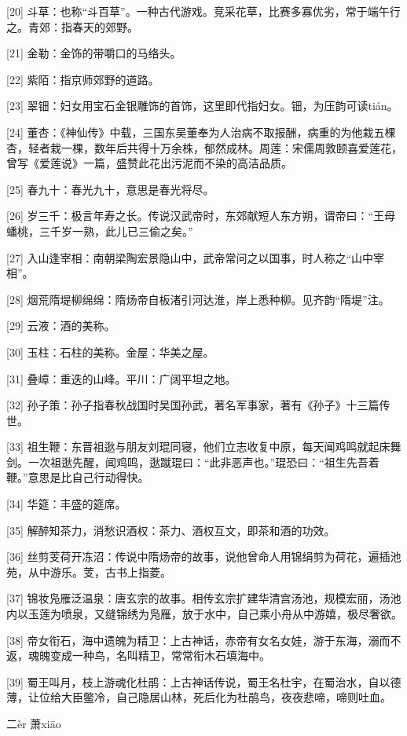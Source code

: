 \documentclass[12pt,UTF8]{ctexbook}
\begin{document}
[20] 斗草：也称“斗百草”。一种古代游戏。竞采花草，比赛多寡优劣，常于端午行之。青郊：指春天的郊野。

[21] 金勒：金饰的带嚼口的马络头。

[22] 紫陌：指京师郊野的道路。

[23] 翠钿：妇女用宝石金银雕饰的首饰，这里即代指妇女。钿，为压韵可读tián。

[24] 董杏：《神仙传》中载，三国东吴董奉为人治病不取报酬，病重的为他栽五棵杏，轻者栽一棵，数年后共得十万余株，郁然成林。周莲：宋儒周敦颐喜爱莲花，曾写《爱莲说》一篇，盛赞此花出污泥而不染的高洁品质。

[25] 春九十：春光九十，意思是春光将尽。

[26] 岁三千：极言年寿之长。传说汉武帝时，东郊献短人东方朔，谓帝曰：“王母蟠桃，三千岁一熟，此儿已三偷之矣。”

[27] 入山逢宰相：南朝梁陶宏景隐山中，武帝常问之以国事，时人称之“山中宰相”。

[28] 烟荒隋堤柳绵绵：隋炀帝自板渚引河达淮，岸上悉种柳。见齐韵“隋堤”注。

[29] 云液：酒的美称。

[30] 玉柱：石柱的美称。金屋：华美之屋。

[31] 叠嶂：重迭的山峰。平川：广阔平坦之地。

[32] 孙子策：孙子指春秋战国时吴国孙武，著名军事家，著有《孙子》十三篇传世。

[33] 祖生鞭：东晋祖逖与朋友刘琨同寝，他们立志收复中原，每天闻鸡鸣就起床舞剑。一次祖逖先醒，闻鸡鸣，逖蹴琨曰：“此非恶声也。”琨恐曰：“祖生先吾着鞭。”意思是比自己行动得快。

[34] 华筵：丰盛的筵席。

[35] 解醉知茶力，消愁识酒权：茶力、酒权互文，即茶和酒的功效。

[36] 丝剪芰荷开冻沼：传说中隋炀帝的故事，说他曾命人用锦绢剪为荷花，遍插池苑，从中游乐。芰，古书上指菱。

[37] 锦妆凫雁泛温泉：唐玄宗的故事。相传玄宗扩建华清宫汤池，规模宏丽，汤池内以玉莲为喷泉，又缝锦绣为凫雁，放于水中，自己乘小舟从中游嬉，极尽奢欲。

[38] 帝女衔石，海中遗魄为精卫：上古神话，赤帝有女名女娃，游于东海，溺而不返，魂魄变成一种鸟，名叫精卫，常常衔木石填海中。

[39] 蜀王叫月，枝上游魂化杜鹃：上古神话传说，蜀王名杜宇，在蜀治水，自以德薄，让位给大臣鳖冷，自己隐居山林，死后化为杜鹃鸟，夜夜悲啼，啼则吐血。





二èr 萧xiāo
\end{document}
